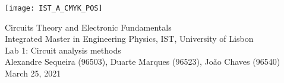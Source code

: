 \thispagestyle {empty}

\texttt{[image: IST\_A\_CMYK\_POS]}

\begin{center}

\vspace{1.0cm}

\vspace{1cm}
{\FontLb Circuits Theory and Electronic Fundamentals} \\ 
\vspace{0.5cm}
{\FontSn Integrated Master in Engineering Physics, IST, University of Lisbon} \\
\vspace{0.5cm}
{\FontSn Lab 1: Circuit analysis methods} \\
\vspace{0.2cm}
{\FontSn Alexandre Sequeira (96503), Duarte Marques (96523), João Chaves (96540)} \\
\vspace{0.2cm}
{\FontSn March 25, 2021} \\ %
%
\end{center}

